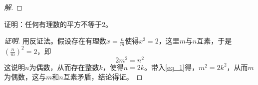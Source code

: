 \documentclass{book}[oneside]
\begin{document}
\begin{CJK*}{UTF8}{gbsn}
\begin{proof}[解]
  \end{proof}
  
  证明：任何有理数的平方不等于2。
\begin{proof}[证明]
  用反证法。假设存在有理数$x=\frac{n}{m}$使得$x^2=2$，这里$m$与$n$互素，于是$(\frac{n}{m})^2=2$，即
  \begin{equation}\label{eq_1}
    2m^2=n^2
  \end{equation}
  这说明$n$为偶数，从而存在整数$k$，使得$n=2k$。带入\eqref{eq_1}得，$m^2=2k^2$，从而$m$为偶数，这与$m$和$n$互素矛盾，结论得证。
\end{proof}


      \chapter{}

\end{CJK*}
\end{document}
